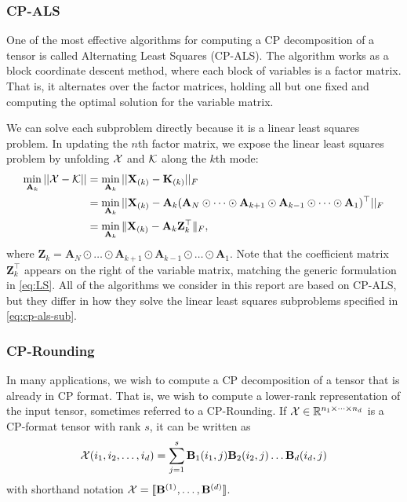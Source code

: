 \documentclass{article}
\newcommand{\mat}[1]{\mathbf{#1}}
\newcommand{\T}[2][]{#1{\mathbf{\cal{#2}}}} 						%
\begin{document}
\subsubsection{CP-ALS}

One of the most effective algorithms for computing a CP decomposition of a tensor is called Alternating Least Squares (CP-ALS).
The algorithm works as a block coordinate descent method, where each block of variables is a factor matrix.
That is, it alternates over the factor matrices, holding all but one fixed and computing the optimal solution for the variable matrix.

We can solve each subproblem directly because it is a linear least squares problem.
In updating the $n$th factor matrix, we expose the linear least squares problem by unfolding $\T{X}$ and $\T{K}$ along the $k$th mode:
\begin{align}
\label{eq:cp-als-sub}
\min_{\mat{A}_k}||\T{X} - \T{K}|| &= \min_{\mat{A}_k}||\mat{X}_{(k)} - \mat{K}_{(k)}||_F \notag \\ 
&=  \min_{\mat{A}_k}||\mat{X}_{(k)} - \mat{A}_k(\mat{A}_N \odot \dots \odot \mat{A}_{k+1} \odot \mat{A}_{k-1} \odot \dots \odot \mat{A}_1)^\top||_F \notag \\ 
&=  \min_{\mat{A}_k}\|\mat{X}_{(k)}-\mat{A}_k\mat{Z}_k^\top\|_F,
\end{align}
where $\mat{Z}_k=\mat{A}_N \odot \dots \odot \mat{A}_{k+1} \odot \mat{A}_{k-1} \odot \dots \odot \mat{A}_1$.
Note that the coefficient matrix $\mat{Z}_k^\top$ appears on the right of the variable matrix, matching the generic formulation in \cref{eq:LS}.
All of the algorithms we consider in this report are based on CP-ALS, but they differ in how they solve the linear least squares subproblems specified in \cref{eq:cp-als-sub}.

\subsubsection{CP-Rounding}
\label{sec:cp-rounding}

In many applications, we wish to compute a CP decomposition of a tensor that is already in CP format.
That is, we wish to compute a lower-rank representation of the input tensor, sometimes referred to a CP-Rounding.
If $\T{X} \in \mathbb{R}^{n_1 \times \dots \times n_d}$ is a CP-format tensor with rank $s$, it can be written as 
$$\T{X}(i_1,i_2,\dots, i_d) = \sum^{s}_{j=1} \mat{B}_1(i_1,j)\mat{B}_2(i_2,j) \dots \mat{B}_d(i_d,j)$$
with shorthand notation $\T{X} = [\![\mat{B}^{(1)}, \dots ,\mat{B}^{(d)}]\!]$.
\end{document}
